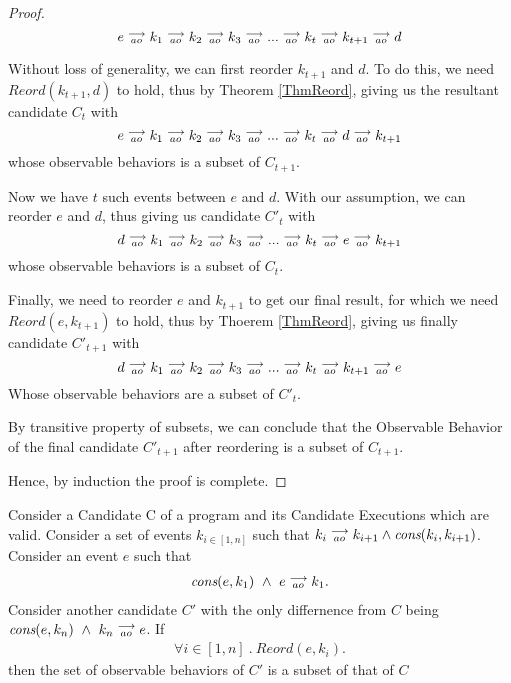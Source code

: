 \begin{proof}
        \[
            e\stackrel{\longrightarrow}{_{ao}}k_1\stackrel{\longrightarrow}{_{ao}}k_2\stackrel{\longrightarrow}{_{ao}}k_3\stackrel{\longrightarrow}{_{ao}}...\stackrel{\longrightarrow}{_{ao}}k_t\stackrel{\longrightarrow}{_{ao}}k_{t+1}\stackrel{\longrightarrow}{_{ao}}d  
        \]

        Without loss of generality, we can first reorder $k_{t+1}$ and $d$. To do this, we need $Reord(k_{t+1}, d)$ to hold, thus by Theorem \ref{ThmReord}, giving us the resultant candidate $C_t$ with  
        \[
            e\stackrel{\longrightarrow}{_{ao}}k_1\stackrel{\longrightarrow}{_{ao}}k_2\stackrel{\longrightarrow}{_{ao}}k_3\stackrel{\longrightarrow}{_{ao}}...\stackrel{\longrightarrow}{_{ao}}k_t\stackrel{\longrightarrow}{_{ao}}d\stackrel{\longrightarrow}{_{ao}}k_{t+1}  
        \]
        whose observable behaviors is a subset of $C_{t+1}$. 

        Now we have $t$ such events between $e$ and $d$. With our assumption, we can reorder $e$ and $d$, thus giving us candidate $C'_t$ with 
        \[
            d\stackrel{\longrightarrow}{_{ao}}k_1\stackrel{\longrightarrow}{_{ao}}k_2\stackrel{\longrightarrow}{_{ao}}k_3\stackrel{\longrightarrow}{_{ao}}...\stackrel{\longrightarrow}{_{ao}}k_t\stackrel{\longrightarrow}{_{ao}}e\stackrel{\longrightarrow}{_{ao}}k_{t+1}  
        \]
        whose observable behaviors is a subset of $C_{t}$. 

        Finally, we need to reorder $e$ and $k_{t+1}$ to get our final result, for which we need $Reord(e, k_{t+1})$ to hold, thus by Thoerem \ref{ThmReord},  giving us finally candidate $C'_{t+1}$ with
        \[
            d\stackrel{\longrightarrow}{_{ao}}k_1\stackrel{\longrightarrow}{_{ao}}k_2\stackrel{\longrightarrow}{_{ao}}k_3\stackrel{\longrightarrow}{_{ao}}...\stackrel{\longrightarrow}{_{ao}}k_t\stackrel{\longrightarrow}{_{ao}}k_{t+1}\stackrel{\longrightarrow}{_{ao}}e  
        \]
        Whose observable behaviors are a subset of $C'_t$. 

        By transitive property of subsets, we can conclude that the Observable Behavior of the final candidate $C'_{t+1}$ after reordering is a subset of $C_{t+1}$.

        Hence, by induction the proof is complete. 
\end{proof}
    
\begin{corollary}
    \label{CorollCodeMotion1}
    Consider a Candidate C of a program and its Candidate Executions which are valid. Consider a set of events $k_{i \in[1,n]}$ such that $k_i\stackrel{\longrightarrow}{_{ao}}k_{i+1} \wedge \textit{cons}(k_i,k_{i+1})$.
    Consider an event $e$ such that 
    \begin{align*}
        \textit{cons}(e,k_1) \ \wedge \ e\stackrel{\longrightarrow}{_{ao}}k_1.  
    \end{align*}
    Consider another candidate $C'$ with the only differnence from $C$ being $\cons{e}{k_n} \ \wedge \ \reln{k_n}{ao}{e}$.
    If 
    \begin{align*}
        \forall i \in [1,n] \ . \ Reord(e,k_i).
    \end{align*}
    then the set of observable behaviors of $C'$ is a subset of that of $C$  
\end{corollary}

